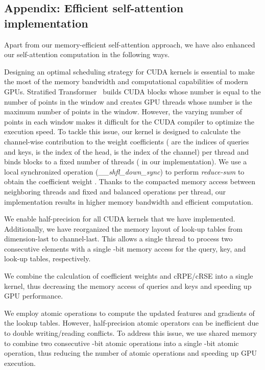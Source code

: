 \documentclass[10pt,twocolumn,letterpaper]{article}
\begin{document}
 
{\small
  
  
}


\appendix


\subsection*{Appendix: Efficient self-attention implementation} \label{app:sec:implementation}
Apart from our memory-efficient self-attention approach, we have also enhanced our self-attention computation in the following ways.

Designing an optimal scheduling strategy for CUDA kernels is essential to make the most of the memory bandwidth and computational capabilities of modern GPUs. Stratified Transformer~\cite{lai2022stratified} builds CUDA blocks whose number is equal to the number of points in the window and creates GPU threads whose number is the maximum number of points in the window. However, the varying number of points in each window makes it difficult for the CUDA compiler to optimize the execution speed. To tackle this issue, our kernel is designed to calculate the channel-wise contribution to the weight coefficients  ( are the indices of queries and keys,  is the index of the head,  is the index of the channel) per thread and binds blocks to a fixed number of threads ( in our implementation). We use a local synchronized operation (\textit{\_\_shfl\_down\_sync}) to perform \textit{reduce-sum} to obtain the coefficient weight . Thanks to the compacted memory access between neighboring threads and fixed and balanced operations per thread, our implementation results in higher memory bandwidth and efficient computation.

 We enable half-precision for all CUDA kernels that we have implemented. Additionally, we have reorganized the memory layout of look-up tables from dimension-last to channel-last. This allows a single thread to process two consecutive elements with a single -bit memory access for the query, key, and look-up tables, respectively.

 We combine the calculation of coefficient weights and cRPE/cRSE into a single kernel, thus decreasing the memory access of queries and keys and speeding up GPU performance.

 We employ atomic operations to compute the updated features and gradients of the lookup tables. However, half-precision atomic operators can be inefficient due to double writing/reading conflicts. To address this issue, we use shared memory to combine two consecutive -bit atomic operations into a single -bit atomic operation, thus reducing the number of atomic operations and speeding up GPU execution.  
\end{document}
